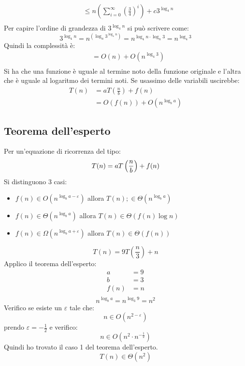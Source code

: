 \documentclass[a4paper]{article}
\begin{document}
\begin{example}
\[\begin{aligned}
    & \le n \left( \sum_{i=0}^{\infty} \left( \frac{3}{4} \right)^i \right) + c 3^{\log_4 n}\\
  \end{aligned}
  \] 
  Per capire l'ordine di grandezza di \( 3^{\log_4 n} \) si può scrivere come:
  \[
    3^{\log_4 n} = n^{\left( \log_n 3^{\log_4 n} \right) } = n^{\log_4 n \cdot \log_n 3}
    = n^{\log_4 3}
  \] 
  Quindi la complessità è:
  \[
  \begin{aligned}
    & = O(n) + O(n^{\log_4 3})\\
  \end{aligned}
  \] 
  Si ha che una funzione è uguale al termine noto della funzione originale e l'altra
  che è uguale al logaritmo dei termini noti. Se usassimo delle variabili uscirebbe:
  \[
    \begin{aligned}
      T(n) & = a T \left(  \frac{n}{b}  \right) + f(n)\\
           & = O(f(n)) + O(n^{\log_b a})
    \end{aligned}
  \] 
\end{example}

\subsection{Teorema dell'esperto}
\begin{theorem}
  Per un'equazione di ricorrenza del tipo:
  \[
    T(n) = a T \left(  \frac{n}{b}  \right) + f(n)\\
  \] 
  Si distinguono 3 casi:
  \begin{itemize}
    \item \( f(n) \in O(n^{\log_b a - \varepsilon}) \) allora \( T(n); \in \Theta(n^{\log_b a}) \)  
    \item \( f(n) \in \Theta(n^{\log_b a}) \) allora \( T(n) \in \Theta(f(n) \log n) \) 
    \item \( f(n) \in \Omega(n^{\log_b a + \varepsilon}) \) allora \( T(n) \in \Theta(f(n)) \) 
  \end{itemize}
\end{theorem}

\begin{example}
  \[
  T(n) = 9 T\left(\frac{n}{3}\right) + n
  \] 
  Applico il teorema dell'esperto:
  \[
  \begin{aligned}
    a & = 9\\
    b & = 3\\
    f(n) & = n\\
  \end{aligned}
  \] 
  \[
    n^{\log_b a} = n^{\log_3 9} = n^2
  \] 
  Verifico se esiste un \( \varepsilon \) tale che:
  \[
    n \in O(n^{2 - \varepsilon})
  \]
  prendo \( \varepsilon = -\frac{1}{2} \) e verifico:
  \[
    n \in O(n^2 \cdot n^{-\frac{1}{2}})
  \] 
  Quindi ho trovato il caso 1 del teorema dell'esperto.
  \[
    T(n) \in \Theta(n^2)
  \] 
\end{example}
\end{document}
